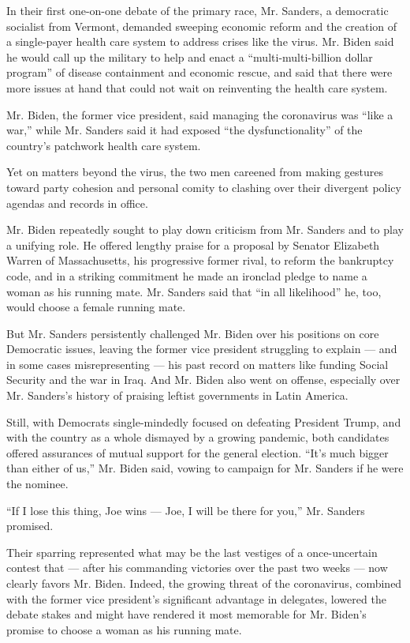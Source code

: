 In their first one-on-one debate of the primary race, Mr. Sanders, a
democratic socialist from Vermont, demanded sweeping economic reform and
the creation of a single-payer health care system to address crises like
the virus. Mr. Biden said he would call up the military to help and
enact a ``multi-multi-billion dollar program'' of disease containment
and economic rescue, and said that there were more issues at hand that
could not wait on reinventing the health care system.

Mr. Biden, the former vice president, said managing the coronavirus was
``like a war,'' while Mr. Sanders said it had exposed ``the
dysfunctionality'' of the country's patchwork health care system.

Yet on matters beyond the virus, the two men careened from making
gestures toward party cohesion and personal comity to clashing over
their divergent policy agendas and records in office.

Mr. Biden repeatedly sought to play down criticism from Mr. Sanders and
to play a unifying role. He offered lengthy praise for a proposal by
Senator Elizabeth Warren of Massachusetts, his progressive former rival,
to reform the bankruptcy code, and in a striking commitment he made an
ironclad pledge to name a woman as his running mate. Mr. Sanders said
that ``in all likelihood'' he, too, would choose a female running mate.

But Mr. Sanders persistently challenged Mr. Biden over his positions on
core Democratic issues, leaving the former vice president struggling to
explain --- and in some cases misrepresenting --- his past record on
matters like funding Social Security and the war in Iraq. And Mr. Biden
also went on offense, especially over Mr. Sanders's history of praising
leftist governments in Latin America.

Still, with Democrats single-mindedly focused on defeating President
Trump, and with the country as a whole dismayed by a growing pandemic,
both candidates offered assurances of mutual support for the general
election. ``It's much bigger than either of us,'' Mr. Biden said, vowing
to campaign for Mr. Sanders if he were the nominee.

``If I lose this thing, Joe wins --- Joe, I will be there for you,'' Mr.
Sanders promised.

Their sparring represented what may be the last vestiges of a
once-uncertain contest that --- after his commanding victories over the
past two weeks --- now clearly favors Mr. Biden. Indeed, the growing
threat of the coronavirus, combined with the former vice president's
significant advantage in delegates, lowered the debate stakes and might
have rendered it most memorable for Mr. Biden's promise to choose a
woman as his running mate.

